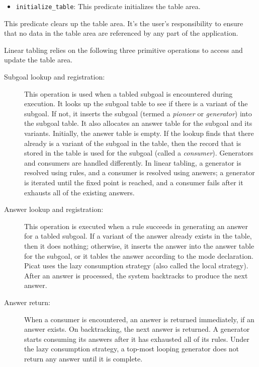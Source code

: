 \begin{itemize}
\item \texttt{initialize\_table}: This predicate initializes the table area.   
\end{itemize}
This predicate clears up the table area. It's the user's responsibility to ensure that no data in the table area are referenced by any part of the application.

Linear tabling relies on the following three primitive operations to access and update the table area.

\begin{description}
\item[Subgoal lookup and registration:] This operation is used when a tabled subgoal is encountered during execution. It looks up the subgoal table to see if there is a variant of the subgoal. If not, it inserts the subgoal (termed a \emph{pioneer} or \emph{generator}) into the subgoal table. It also allocates an answer table for the subgoal and its variants. Initially, the answer table is empty. If the lookup finds that there already is a variant of the subgoal in the table, then the record that is stored in the table is used for the subgoal (called a \emph{consumer}). Generators and consumers are handled differently. In linear tabling, a generator is resolved using rules, and a consumer is resolved using answers; a generator is iterated until the fixed point is reached, and a consumer fails after it exhausts all of the existing answers.
\item[Answer lookup and registration:] This operation is executed when a rule succeeds in generating an answer for a tabled subgoal. If a variant of the answer already exists in the table, then it does nothing; otherwise, it inserts the answer into the answer table for the subgoal, or it tables the answer according to the mode declaration. Picat uses the lazy consumption strategy (also called the local strategy). After an answer is processed, the system backtracks to produce the next answer. 
\item[Answer return:] When a consumer is encountered, an answer is returned immediately, if an answer exists. On backtracking, the next answer is returned. A generator starts consuming its answers after it has exhausted all of its rules. Under the lazy consumption strategy, a top-most looping generator does not return any answer until it is complete.
\end{description}


